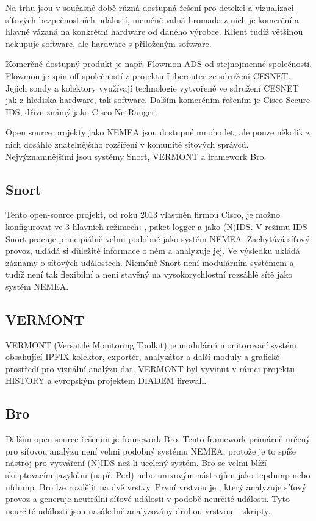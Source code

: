 Na trhu jsou v současné době různá dostupná řešení pro detekci a vizualizaci síťových bezpečnostních událostí, nicméně valná hromada z nich je komerční a hlavně vázaná na konkrétní hardware od daného výrobce. Klient tudíž většinou nekupuje software, ale hardware s přiloženým software.

Komerčně dostupný produkt je např. Flowmon\cite{flowmon:report} ADS\cite{flowmon:ads} od stejnojmenné společnosti. Flowmon je spin-off společností z projektu Liberouter ze sdružení CESNET. Jejich sondy a kolektory využívají technologie vytvořené ve sdružení CESNET jak z hlediska hardware, tak software. Dalším komerčním řešením je Cisco Secure IDS\cite{cisco:ids}, dříve známý jako Cisco NetRanger.

Open source projekty jako NEMEA jsou dostupné mnoho let, ale pouze několik z nich dosáhlo znatelnějšího rozšíření v komunitě síťových správců. Nejvýznamnějšími jsou systémy Snort\cite{snort}, VERMONT\cite{vermont} a framework Bro\cite{bro}. 

\subsection{Snort}
Tento open-source projekt, od roku 2013 vlastněn firmou Cisco\cite{snort:cisco}, je možno konfigurovat ve 3 hlavních režimech\cite{snort:modes}: , paket logger a jako (N)IDS. V režimu IDS Snort pracuje principiálně velmi podobně jako systém NEMEA. Zachytává síťový provoz, ukládá si důležité informace o něm a analyzuje jej. Ve výsledku ukládá záznamy o síťových událostech. Nicméně Snort není modulárním systémem a tudíž není tak flexibilní a není stavěný na vysokorychlostní rozsáhlé sítě jako systém NEMEA.

\subsection{VERMONT}

VERMONT (Versatile Monitoring Toolkit) je modulární monitorovací systém obsahující IPFIX kolektor, exportér, analyzátor a další moduly a grafické prostředí pro vizuální analýzu dat. VERMONT byl vyvinut v rámci projektu HISTORY\cite{vermont:history} a evropským projektem DIADEM firewall\cite{vermont:diadem}.

\subsection{Bro}
Dalším open-source řešením je framework Bro. Tento framework primárně určený pro síťovou analýzu není velmi podobný systému NEMEA, protože je to spíše nástroj pro vytváření (N)IDS než-li ucelený systém. Bro se velmi blíží skriptovacím jazykům (např. Perl) nebo unixovým nástrojům jako tcpdump nebo nfdump. Bro lze rozdělit na dvě vrstvy. První vrstvou je , který analyzuje síťový provoz a generuje neutrální síťové události v podobě neurčité události. Tyto neurčité události jsou nasáledně analyzovány druhou vrstvou --  skripty.

